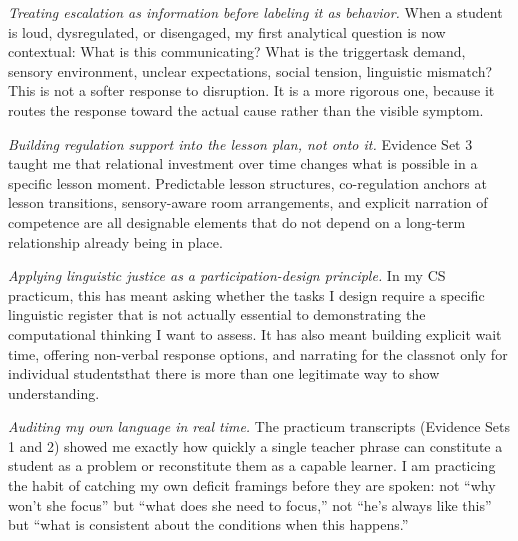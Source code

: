 \documentclass[12pt]{article}
\begin{document}
\textit{Treating escalation as information before labeling it as behavior.} When a student is loud, dysregulated, or disengaged, my first analytical question is now contextual: What is this communicating? What is the trigger\textemdash{}task demand, sensory environment, unclear expectations, social tension, linguistic mismatch? This is not a softer response to disruption. It is a more rigorous one, because it routes the response toward the actual cause rather than the visible symptom.

\textit{Building regulation support into the lesson plan, not onto it.} Evidence Set 3 taught me that relational investment over time changes what is possible in a specific lesson moment. Predictable lesson structures, co-regulation anchors at lesson transitions, sensory-aware room arrangements, and explicit narration of competence are all designable elements that do not depend on a long-term relationship already being in place.

\textit{Applying linguistic justice as a participation-design principle.} In my CS practicum, this has meant asking whether the tasks I design require a specific linguistic register that is not actually essential to demonstrating the computational thinking I want to assess. It has also meant building explicit wait time, offering non-verbal response options, and narrating for the class\textemdash{}not only for individual students\textemdash{}that there is more than one legitimate way to show understanding.

\textit{Auditing my own language in real time.} The practicum transcripts (Evidence Sets 1 and 2) showed me exactly how quickly a single teacher phrase can constitute a student as a problem or reconstitute them as a capable learner. I am practicing the habit of catching my own deficit framings before they are spoken: not ``why won't she focus'' but ``what does she need to focus,'' not ``he's always like this'' but ``what is consistent about the conditions when this happens.''

\newpage
\end{document}
